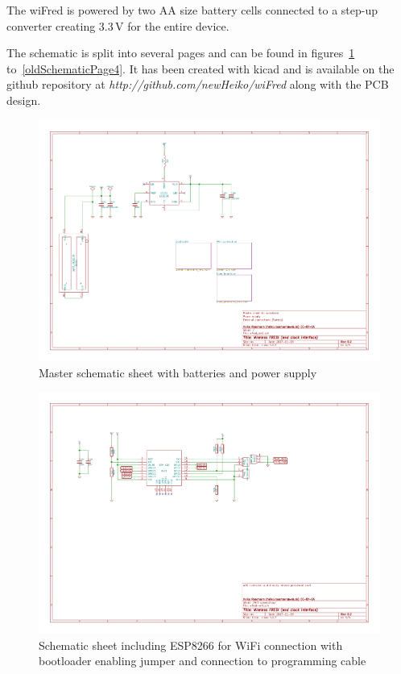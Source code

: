 \documentclass[11pt,a4paper]{scrartcl}
\begin{document}
The wiFred is powered by two AA size battery cells connected to a step-up converter creating 3.3\,V for the entire device.

The schematic is split into several pages and can be found in figures~\ref{oldSchematicPage1} to~\ref{oldSchematicPage4}. It has been created with kicad and is available on the github repository at \textit{http://github.com/newHeiko/wiFred} along with the PCB design.

\begin{figure}[tbh]
  \centering
  \includegraphics[width=\textwidth]{images/wfred_rev2}
  \caption{Master schematic sheet with batteries and power supply}
  \label{oldSchematicPage1}
\end{figure}

\begin{figure}[tbh]
  \centering
  \includegraphics[width=\textwidth]{images/wfred-wifi-Wifi_connection}
  \caption{Schematic sheet including ESP8266 for WiFi connection with bootloader enabling jumper and connection to programming cable}
  \label{oldSchematicPage2}
\end{figure}
\end{document}
